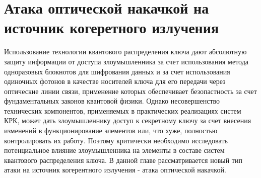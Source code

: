 \chapter{Атака оптической накачкой на источник когеретного излучения}\label{ch:ch4}
 Использование технологии квантового распределения ключа дают абсолютную защиту информации от доступа злоумышленника за счет использования метода одноразовых блокнотов для шифрования данных и за счет использования одиночных фотонов в качестве носителей ключа для его передачи через оптические линии связи, применение которых обеспечивает безопастность за счет фундаментальных законов квантовой физики. Однако несовершенство технических компонентов, применяемых в практических реализациях систем КРК, может дать злоумышленнику  доступ к секретному ключу за счет внесения изменений в функционирование элементов или, что хуже, полностью контролировать их работу. Поэтому критически необходимо исследовать потенциальное влияние злоумышленника на элементы в составе систем квантового распределения ключа. В данной главе рассматривается новый тип атаки на источник когерентного излучения - атака оптической накачкой.

